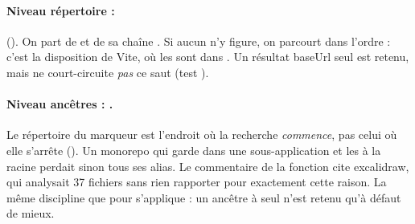 \paragraph{Niveau répertoire : } (). On part de  et de sa chaîne . Si aucun  n'y figure, on parcourt  dans l'ordre : c'est la disposition de Vite, où les  sont dans . Un résultat \og baseUrl seul\fg{} est retenu, mais ne court-circuite \emph{pas} ce saut (test ).

\paragraph{Niveau ancêtres : .}


Le répertoire du marqueur est l'endroit où la recherche \emph{commence}, pas celui où elle s'arrête (). Un monorepo qui garde  dans une sous-application et les  à la racine perdait sinon tous ses alias. Le commentaire de la fonction cite excalidraw, qui analysait 37 fichiers sans rien rapporter pour exactement cette raison. La même discipline que pour  s'applique : un ancêtre à  seul n'est retenu qu'à défaut de mieux.

